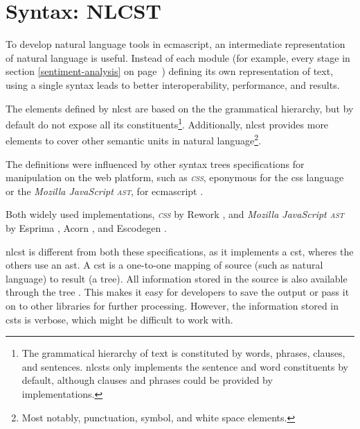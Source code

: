\section{Syntax: NLCST}\label{syntax}

To develop natural language tools in \gls{ecmascript}, an intermediate
  representation of natural language is useful.
Instead of each module (for example, every stage in section
  \ref{sentiment-analysis} on page~\pageref{apendix-a-nlcst-definition})
  defining its own representation of text, using a single syntax leads to
  better interoperability, performance, and results.

The elements defined by \acrfull{nlcst} are based on the the grammatical
  hierarchy, but by default do not expose all its constituents\footnote{The
      grammatical hierarchy of text is constituted by words, phrases,
      clauses, and sentences.
    \glspl{nlcst} only implements the sentence and word constituents
    by default, although clauses and phrases could be provided by
    implementations.}.
Additionally, \gls{nlcst} provides more elements to cover other semantic
  units in natural language\footnote{Most
    notably, punctuation, symbol, and white space elements.}.

The definitions were influenced by other syntax trees specifications for
  manipulation on the web platform, such as \emph{\textsc{css}}, eponymous
  for the \acrshort{css} language \autocite{reworkcss/css-source-code} or the
  \emph{Mozilla JavaScript \textsc{ast}}, for \gls{ecmascript}
  \autocite{mozilla.org-spidermonkey-parser_api}.

Both widely used implementations, \emph{\textsc{css}} by Rework
  \autocite{reworkcss/rework-source-code}, and \emph{Mozilla JavaScript
  \textsc{ast}} by Esprima \autocite{ariya/esprima-source-code}, Acorn
  \autocite{marijnh/acorn-source-code}, and Escodegen
  \autocite{constellation/escodegen-source-code}.

\gls{nlcst} is different from both these specifications, as it implements a
  \gls{cst}, wheres the others use an \gls{ast}.
A \gls{cst} is a one-to-one mapping of source (such as natural language)
  to result (a tree).
All information stored in the source is also available through the tree
  \autocite{thegreenplace.net-abstract-concrete-syntax-trees}.
This makes it easy for developers to save the output or pass it on to other
  libraries for further processing.
However, the information stored in \glspl{cst} is verbose, which might be
  difficult to work with.

